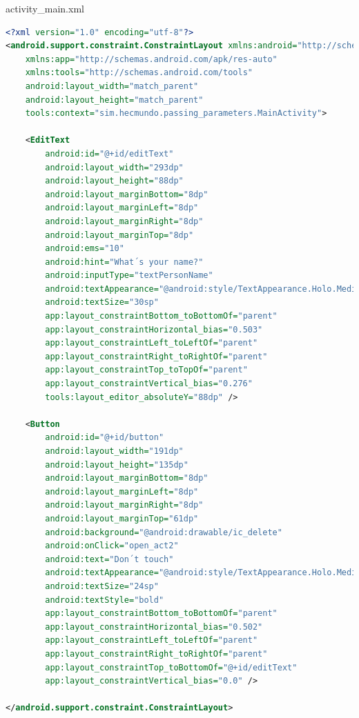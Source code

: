 \documentclass{report}
\begin{document}
activity\_main.xml
\begin{lstlisting}[language=xml]
<?xml version="1.0" encoding="utf-8"?>
<android.support.constraint.ConstraintLayout xmlns:android="http://schemas.android.com/apk/res/android"
    xmlns:app="http://schemas.android.com/apk/res-auto"
    xmlns:tools="http://schemas.android.com/tools"
    android:layout_width="match_parent"
    android:layout_height="match_parent"
    tools:context="sim.hecmundo.passing_parameters.MainActivity">

    <EditText
        android:id="@+id/editText"
        android:layout_width="293dp"
        android:layout_height="88dp"
        android:layout_marginBottom="8dp"
        android:layout_marginLeft="8dp"
        android:layout_marginRight="8dp"
        android:layout_marginTop="8dp"
        android:ems="10"
        android:hint="What´s your name?"
        android:inputType="textPersonName"
        android:textAppearance="@android:style/TextAppearance.Holo.Medium"
        android:textSize="30sp"
        app:layout_constraintBottom_toBottomOf="parent"
        app:layout_constraintHorizontal_bias="0.503"
        app:layout_constraintLeft_toLeftOf="parent"
        app:layout_constraintRight_toRightOf="parent"
        app:layout_constraintTop_toTopOf="parent"
        app:layout_constraintVertical_bias="0.276"
        tools:layout_editor_absoluteY="88dp" />

    <Button
        android:id="@+id/button"
        android:layout_width="191dp"
        android:layout_height="135dp"
        android:layout_marginBottom="8dp"
        android:layout_marginLeft="8dp"
        android:layout_marginRight="8dp"
        android:layout_marginTop="61dp"
        android:background="@android:drawable/ic_delete"
        android:onClick="open_act2"
        android:text="Don´t touch"
        android:textAppearance="@android:style/TextAppearance.Holo.Medium"
        android:textSize="24sp"
        android:textStyle="bold"
        app:layout_constraintBottom_toBottomOf="parent"
        app:layout_constraintHorizontal_bias="0.502"
        app:layout_constraintLeft_toLeftOf="parent"
        app:layout_constraintRight_toRightOf="parent"
        app:layout_constraintTop_toBottomOf="@+id/editText"
        app:layout_constraintVertical_bias="0.0" />

</android.support.constraint.ConstraintLayout>

\end{lstlisting}
\end{document}
